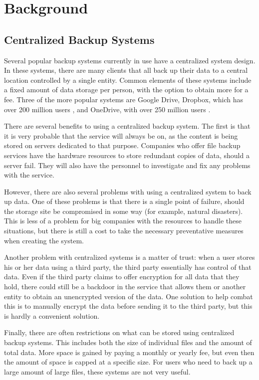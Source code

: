 \documentclass[12pt]{report}
\begin{document}
\chapter{Background} \label{chap:Background}
\section{Centralized Backup Systems}
Several popular backup systems currently in use have a centralized system design. In these systems, there are many clients that all back up their data to a central location controlled by a single entity. Common elements of these systems include a fixed amount of data storage per person, with the option to obtain more for a fee. Three of the more popular systems are Google Drive, Dropbox, which has over 200 million users \cite{dropboxusers}, and OneDrive, with over 250 million users \cite{onedriveusers}.

There are several benefits to using a centralized backup system. The first is that it is very probable that the service will always be on, as the content is being stored on servers dedicated to that purpose. Companies who offer file backup services have the hardware resources to store redundant copies of data, should a server fail. They will also have the personnel to investigate and fix any problems with the service.

However, there are also several problems with using a centralized system to back up data. One of these problems is that there is a single point of failure, should the storage site be compromised in some way (for example, natural disasters). This is less of a problem for big companies with the resources to handle these situations, but there is still a cost to take the necessary preventative measures when creating the system.

Another problem with centralized systems is a matter of trust: when a user stores his or her data using a third party, the third party essentially has control of that data. Even if the third party claims to offer encryption for all data that they hold, there could still be a backdoor in the service that allows them or another entity to obtain an unencrypted version of the data. One solution to help combat this is to manually encrypt the data before sending it to the third party, but this is hardly a convenient solution.

Finally, there are often restrictions on what can be stored using centralized backup systems. This includes both the size of individual files and the amount of total data. More space is gained by paying a monthly or yearly fee, but even then the amount of space is capped at a specific size. For users who need to back up a large amount of large files, these systems are not very useful.
\end{document}
